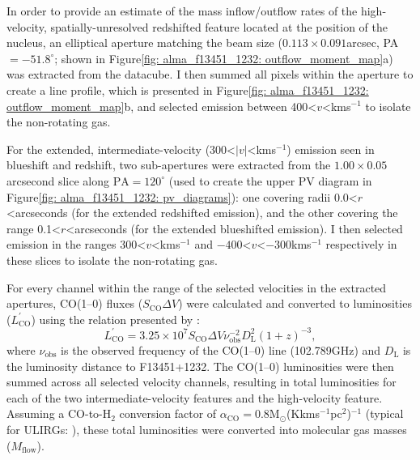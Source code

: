In order to provide an estimate of the mass inflow/outflow rates of the high-velocity, spatially-unresolved redshifted feature located at the position of the nucleus, an elliptical aperture matching the beam size ($0.113\times0.091$\;arcsec, PA$=-51.8^\circ$; shown in Figure\;\ref{fig: alma_f13451_1232: outflow_moment_map}a) was extracted from the datacube. I then summed all pixels within the aperture to create a line profile, which is presented in Figure\;\ref{fig: alma_f13451_1232: outflow_moment_map}b, and selected emission between 400\;\textless\;$v$\;\textless{}\;km\;s$^{-1}$ to isolate the non-rotating gas. 

For the extended, intermediate-velocity (300\;\textless\;$|v|$\;\textless{}\;km\;s$^{-1}$) emission seen in blueshift and redshift, two sub-apertures were extracted from the $1.00\times0.05$\;arcsecond slice along $\mathrm{PA}=120^\circ$ (used to create the upper PV diagram in Figure\;\ref{fig: alma_f13451_1232: pv_diagrams}): one covering radii 0.0\;\textless\;$r$\;\textless{}\;arcseconds (for the extended redshifted emission), and the other covering the range 0.1\;\textless\;$r$\;\textless{}\;arcseconds (for the extended blueshifted emission). I then selected emission in the ranges 300\;\textless\;$v$\;\textless{}\;km\;s$^{-1}$ and $-400$\;\textless\;$v$\;\textless$-300$\;km\;s$^{-1}$ respectively in these slices to isolate the non-rotating gas.

For every channel within the range of the selected velocities in the extracted apertures, CO(1--0) fluxes ($S_\mathrm{CO}\Delta V$) were calculated and converted to luminosities ($L^\prime_\mathrm{CO}$) using the relation presented by \citet{Solomon2005}:
\begin{equation}
    L^\prime_\mathrm{CO} = 3.25\times10^7 S_\mathrm{CO}\Delta V {\nu}^{-2}_\mathrm{obs}D^2_\mathrm{L}(1+z)^{-3},
    \label{eq: alma_f13451_1232: co_luminosity}
\end{equation}
where ${\nu}_\mathrm{obs}$ is the observed frequency of the CO(1--0) line (102.789\;GHz) and $D_\mathrm{L}$ is the luminosity distance to F13451+1232. The CO(1--0) luminosities were then summed across all selected velocity channels, resulting in total luminosities for each of the two intermediate-velocity features and the high-velocity feature. Assuming a CO-to-H$_\mathrm{2}$ conversion factor of $\alpha_\mathrm{CO}=0.8$\;M$_\odot$\;(K\;km\;s$^{-1}$\;pc$^2$)$^{-1}$ (typical for ULIRGs: \citealt{Downes1998}), these total luminosities were converted into molecular gas masses ($M_\mathrm{flow}$). 

